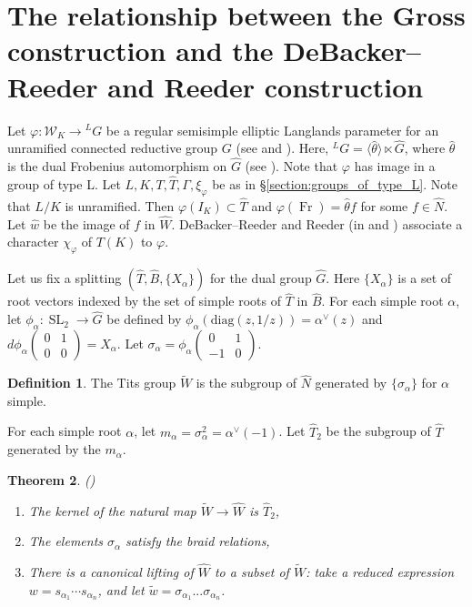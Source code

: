 \documentclass[11pt]{amsart}
\theoremstyle{plain}
\newtheorem{theorem}{Theorem}[section]
\theoremstyle{definition}
\newtheorem{definition}[theorem]{Definition}
\DeclareMathOperator{\Fr}{Fr}
\DeclareMathOperator{\SL}{SL}
\newcommand{\mat}[4]{\left( \begin{array}{cc} {#1} & {#2} \\ {#3} & {#4}
\end{array} \right)}
\newcommand{\Weil}{\mathcal{W}}
\begin{document}
\section{The relationship between the Gross construction and the DeBacker--Reeder and Reeder construction}
\label{section:gross_debacker_reeder}

Let $\varphi : \Weil_K \rightarrow {}^L G$ be a regular semisimple elliptic Langlands
parameter for an unramified connected reductive group $G$
(see \cite{reeder-debacker:09a} and \cite{reeder:08a}).
Here, ${}^L G = \langle \hat{\theta} \rangle \ltimes \hat{G}$,
where $\hat{\theta}$ is the dual Frobenius automorphism on $\hat{G}$
(see \cite[\S 3]{reeder-debacker:09a}).
Note that $\varphi$ has image in a group of
type L.  Let $L,K,T,\hat{T}, \Gamma, \xi_{\varphi}$ be as in
\S\ref{section:groups_of_type_L}.  Note that $L/K$ is unramified.
Then $\varphi(I_K) \subset \hat{T}$ and
$\varphi(\Fr) = \hat{\theta} f$ for some $f \in \hat{N}$.  Let $\hat{w}$
be the image of $f$ in $\hat{W}$.
DeBacker--Reeder and Reeder (in \cite{reeder-debacker:09a}
and \cite{reeder:08a}) associate a character $\chi_{\varphi}$ of $T(K)$ to $\varphi$.

Let us fix a splitting $(\hat{T}, \hat{B}, \{X_{\alpha} \})$
for the dual group $\hat{G}$.  Here $\{ X_{\alpha} \}$ is a set of root vectors
indexed by the set of simple roots of $\hat{T}$ in $\hat{B}$.
For each simple root $\alpha$, let $\phi_{\alpha} : \SL_2 \rightarrow \hat{G}$
be defined by $\phi_{\alpha}(\mathrm{diag}(z,1/z)) = \alpha^{\vee}(z)$
and $d \phi_{\alpha}\mat{0}{1}{0}{0} = X_{\alpha}$. Let
$\sigma_{\alpha} = \phi_{\alpha}\mat{0}{1}{-1}{0}$.

\begin{definition}
  The Tits group $\widetilde{W}$ is the subgroup of $\hat{N}$
  generated by $\{\sigma_{\alpha} \}$ for $\alpha$ simple.
\end{definition}

For each simple root $\alpha$, let $m_{\alpha} = \sigma_{\alpha}^2 = \alpha^{\vee}(-1)$.
Let $\hat{T}_2$ be the subgroup of $\hat{T}$ generated by the $m_{\alpha}$.

\begin{theorem}{(\cite{tits:66a})}
\begin{enumerate}

\item The kernel of the natural map $\widetilde{W} \rightarrow \hat{W}$
  is $\hat{T}_2$,
\item The elements $\sigma_{\alpha}$ satisfy the braid relations,
\item There is a canonical lifting of $\hat{W}$ to a subset of
  $\widetilde{W}$: take a reduced expression $w = s_{\alpha_1} \cdots s_{\alpha_n}$,
  and let $\tilde{w} = \sigma_{\alpha_1} ... \sigma_{\alpha_n}$.
\end{enumerate}
\end{theorem}
\end{document}
